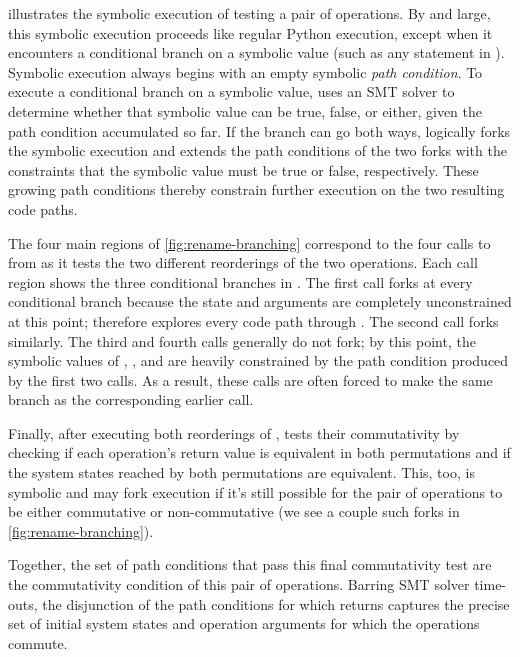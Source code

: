  illustrates the symbolic execution of
 testing a pair of  operations.
%
By and large, this symbolic execution proceeds like regular Python
execution, except when it encounters a conditional branch on a
symbolic value (such as any  statement in ).
Symbolic execution always begins with an empty symbolic \emph{path
  condition}.  To execute a conditional branch on a symbolic value,
\analyzer uses an SMT solver to determine whether that symbolic value
can be true, false, or either, given the path condition accumulated so
far.
%
If the branch can go both ways, \analyzer logically forks the symbolic
execution and extends the path conditions of the two forks with the
constraints that the symbolic value must be true or false,
respectively.  These growing path conditions thereby constrain further
execution on the two resulting code paths.

The four main regions of \cref{fig:rename-branching} correspond to the
four calls to  from  as it tests the two
different reorderings of the two operations.  Each call region shows
the three conditional branches in .  The first call forks
at every conditional branch because the state and arguments are
completely unconstrained at this point; \analyzer therefore explores
every code path through .  The second call forks
similarly.  The third and fourth calls generally do not fork; by this
point, the symbolic values of , , and
 are heavily constrained by the path condition produced by
the first two calls.  As a result, these calls are often forced to
make the same branch as the corresponding earlier call.

Finally, after executing both reorderings of ,
 tests their commutativity by checking if each
operation's return value is equivalent in both permutations and if the
system states reached by both permutations are equivalent.  This, too,
is symbolic and may fork execution if it's still possible for the pair
of operations to be either commutative or non-commutative (we see a
couple such forks in \cref{fig:rename-branching}).

Together, the set of path conditions that pass this final
commutativity test are the commutativity condition of this pair of
operations.  Barring SMT solver time-outs, the disjunction of the path
conditions for which  returns  captures the
precise set of initial system states and operation arguments for which
the operations commute.

